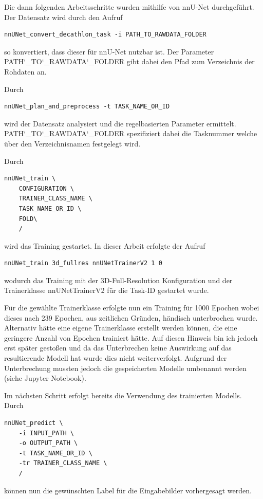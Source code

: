 Die dann folgenden Arbeitsschritte wurden mithilfe von nnU-Net durchgeführt. Der Datensatz wird durch den Aufruf
\begin{lstlisting}
nnUNet_convert_decathlon_task -i PATH_TO_RAWDATA_FOLDER
\end{lstlisting}
so konvertiert, dass dieser für nnU-Net nutzbar ist.
Der Parameter \newline \glqq PATH\char`_TO\char`_RAWDATA\char`_FOLDER\grqq{} gibt dabei den Pfad zum Verzeichnis der Rohdaten an. 

Durch
\begin{lstlisting}
nnUNet_plan_and_preprocess -t TASK_NAME_OR_ID
\end{lstlisting}
wird der Datensatz analysiert und die regelbasierten Parameter ermittelt. \newline \glqq PATH\char`_TO\char`_RAWDATA\char`_FOLDER\grqq{} spezifiziert dabei die Tasknummer welche über den Verzeichnisnamen festgelegt wird.

Durch 
\begin{lstlisting}
nnUNet_train \
	CONFIGURATION \
	TRAINER_CLASS_NAME \
	TASK_NAME_OR_ID \
	FOLD\
	/
\end{lstlisting}
wird das Training gestartet. In dieser Arbeit erfolgte der Aufruf
\begin{lstlisting}
nnUNet_train 3d_fullres nnUNetTrainerV2 1 0
\end{lstlisting}
wodurch das Training mit der \glqq 3D-Full-Resolution\grqq{} Konfiguration und der Trainerklasse \glqq nnUNetTrainerV2\grqq{} für die Task-ID \grqq{} gestartet wurde.

Für die gewählte Trainerklasse erfolgte nun ein Training für 1000 Epochen wobei dieses nach 239 Epochen, aus zeitlichen Gründen, händisch unterbrochen wurde. Alternativ hätte eine eigene Trainerklasse erstellt werden können, die eine geringere Anzahl von Epochen trainiert hätte. Auf diesen Hinweis bin ich jedoch erst später gestoßen und da das Unterbrechen keine Auswirkung auf das resultierende Modell hat wurde dies nicht weiterverfolgt. Aufgrund der Unterbrechung mussten jedoch die gespeicherten Modelle umbenannt werden (siehe Jupyter Notebook). 

Im nächsten Schritt erfolgt bereits die Verwendung des trainierten Modells. Durch
\begin{lstlisting}
nnUNet_predict \
	-i INPUT_PATH \
	-o OUTPUT_PATH \
	-t TASK_NAME_OR_ID \
	-tr TRAINER_CLASS_NAME \
	/
\end{lstlisting}
können nun die gewünschten Label für die Eingabebilder vorhergesagt werden.

